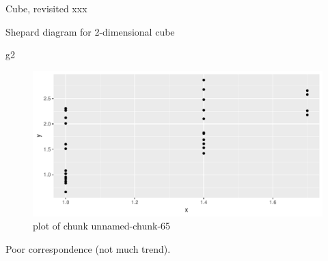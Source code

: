\documentclass[ignorenonframetext,]{beamer}
\newenvironment{Shaded}{\begin{snugshade}}{\end{snugshade}}
\newcommand{\DataTypeTok}[1]{\textcolor[rgb]{0.13,0.29,0.53}{#1}}
\newcommand{\FloatTok}[1]{\textcolor[rgb]{0.00,0.00,0.81}{#1}}
\newcommand{\KeywordTok}[1]{\textcolor[rgb]{0.13,0.29,0.53}{\textbf{#1}}}
\newcommand{\NormalTok}[1]{#1}
\newcommand{\OperatorTok}[1]{\textcolor[rgb]{0.81,0.36,0.00}{\textbf{#1}}}
\newcommand{\StringTok}[1]{\textcolor[rgb]{0.31,0.60,0.02}{#1}}
\begin{document}
\begin{frame}[fragile]{Cube, revisited xxx}
\footnotesize

\begin{Shaded}
\end{Shaded}

\normalsize

\end{frame}

\begin{frame}[fragile]{Shepard diagram for 2-dimensional cube}
\protect\hypertarget{shepard-diagram-for-2-dimensional-cube}{}

\begin{Shaded}
\begin{Highlighting}[]
\NormalTok{g2}
\end{Highlighting}
\end{Shaded}

\begin{figure}
\centering
\includegraphics{figure/unnamed-chunk-65-1.pdf}
\caption{plot of chunk unnamed-chunk-65}
\end{figure}

Poor correspondence (not much trend).

\end{frame}
\end{document}
